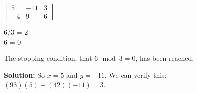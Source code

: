 \documentclass{article}
\begin{document}
{{		\begin{minipage}[c]{.20\linewidth}	
			\begin{center}
				$\begin{bmatrix}
					5 & -11 & 3 \\
					-4 & 9 & 6
				\end{bmatrix}$ 
			\end{center}			
		\end{minipage}
		\begin{minipage}[c]{.40\linewidth}
			\begin{flalign*}
				6/3 = 2 \\
				6  = 0 	
			\end{flalign*}	
		\end{minipage}
		\begin{minipage}[c]{.33\linewidth}
			The stopping condition, that \(6 \mod 3 = 0 \), has been reached. 
		\end{minipage}
		\newline
		\newline
		
		\par\noindent \textbf{Solution:} So \(x=5\) and \(y=-11\). We can verify this: \((93)(5) + (42)(-11) = 3\).
}

}
\newline
\newline
\newline
\end{document}
